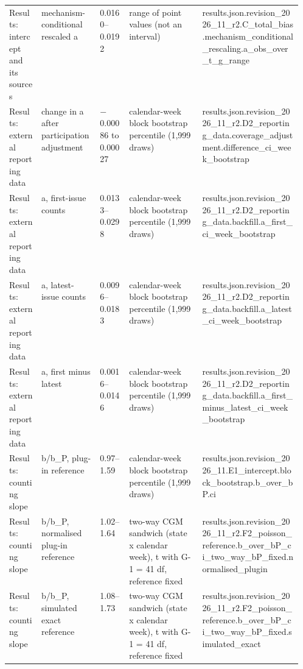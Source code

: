 \begin{table}[!tbp]
\begin{tabularx}{\linewidth}{@{}p{0.11\linewidth}p{0.2\linewidth}lp{0.25\linewidth}X@{}}
Results: intercept and its sources & mechanism-conditional rescaled a & 0.0160--0.0192 & range of point values (not an interval) & {\ttfamily\tiny results.\allowbreak{}json.\allowbreak{}revision\_2026\_11\_r2.\allowbreak{}C\_total\_bias.\allowbreak{}mechanism\_conditional\_rescaling.\allowbreak{}a\_obs\_over\_t\_g\_range} \\
Results: external reporting data & change in a after participation adjustment & $-$0.00086 to 0.00027 & calendar-week block bootstrap percentile (1,999 draws) & {\ttfamily\tiny results.\allowbreak{}json.\allowbreak{}revision\_2026\_11\_r2.\allowbreak{}D2\_reporting\_data.\allowbreak{}coverage\_adjustment.\allowbreak{}difference\_ci\_week\_bootstrap} \\
Results: external reporting data & a, first-issue counts & 0.0133--0.0298 & calendar-week block bootstrap percentile (1,999 draws) & {\ttfamily\tiny results.\allowbreak{}json.\allowbreak{}revision\_2026\_11\_r2.\allowbreak{}D2\_reporting\_data.\allowbreak{}backfill.\allowbreak{}a\_first\_ci\_week\_bootstrap} \\
Results: external reporting data & a, latest-issue counts & 0.0096--0.0183 & calendar-week block bootstrap percentile (1,999 draws) & {\ttfamily\tiny results.\allowbreak{}json.\allowbreak{}revision\_2026\_11\_r2.\allowbreak{}D2\_reporting\_data.\allowbreak{}backfill.\allowbreak{}a\_latest\_ci\_week\_bootstrap} \\
Results: external reporting data & a, first minus latest & 0.0016--0.0146 & calendar-week block bootstrap percentile (1,999 draws) & {\ttfamily\tiny results.\allowbreak{}json.\allowbreak{}revision\_2026\_11\_r2.\allowbreak{}D2\_reporting\_data.\allowbreak{}backfill.\allowbreak{}a\_first\_minus\_latest\_ci\_week\_bootstrap} \\
Results: counting slope & b/b\_P, plug-in reference & 0.97--1.59 & calendar-week block bootstrap percentile (1,999 draws) & {\ttfamily\tiny results.\allowbreak{}json.\allowbreak{}revision\_2026\_11.\allowbreak{}E1\_intercept.\allowbreak{}block\_bootstrap.\allowbreak{}b\_over\_bP.\allowbreak{}ci} \\
Results: counting slope & b/b\_P, normalised plug-in reference & 1.02--1.64 & two-way CGM sandwich (state x calendar week), t with G-1 = 41 df, reference fixed & {\ttfamily\tiny results.\allowbreak{}json.\allowbreak{}revision\_2026\_11\_r2.\allowbreak{}F2\_poisson\_reference.\allowbreak{}b\_over\_bP\_ci\_two\_way\_bP\_fixed.\allowbreak{}normalised\_plugin} \\
Results: counting slope & b/b\_P, simulated exact reference & 1.08--1.73 & two-way CGM sandwich (state x calendar week), t with G-1 = 41 df, reference fixed & {\ttfamily\tiny results.\allowbreak{}json.\allowbreak{}revision\_2026\_11\_r2.\allowbreak{}F2\_poisson\_reference.\allowbreak{}b\_over\_bP\_ci\_two\_way\_bP\_fixed.\allowbreak{}simulated\_exact} \\

\end{tabularx}
\end{table}
